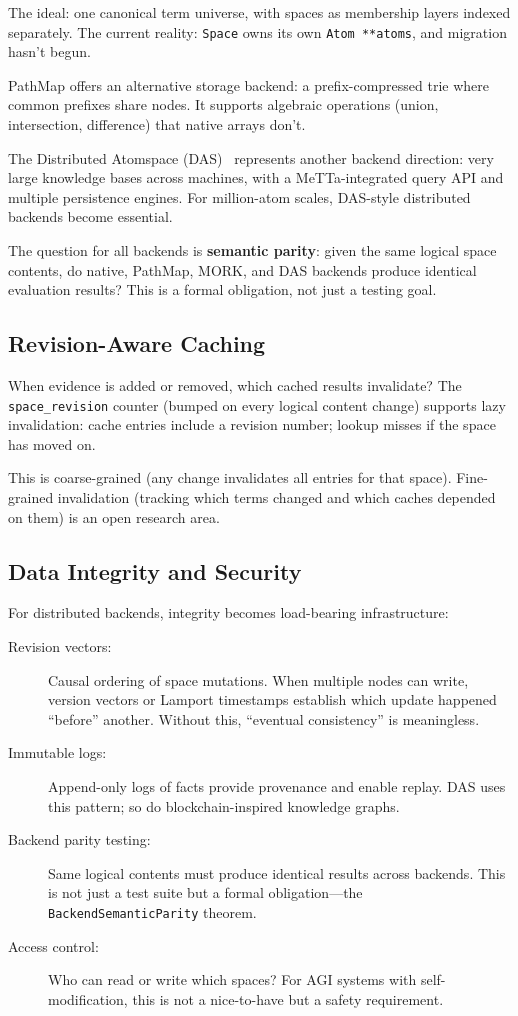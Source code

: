 \documentclass[11pt]{article}
\newcommand{\code}[1]{\texttt{#1}}
\newcommand{\PathMap}{\textup{PathMap}}
\newcommand{\MORK}{\textup{MORK}}
\begin{document}
The ideal: one canonical term universe, with spaces as membership layers
indexed separately.  The current reality: \code{Space} owns its own
\code{Atom **atoms}, and migration hasn't begun.

\PathMap{} offers an alternative storage backend: a prefix-compressed
trie where common prefixes share nodes.  It supports algebraic operations
(union, intersection, difference) that native arrays don't.

The Distributed Atomspace (DAS)~\cite{DAS} represents another backend
direction: very large knowledge bases across machines, with a MeTTa-integrated
query API and multiple persistence engines.  For million-atom scales,
DAS-style distributed backends become essential.

The question for all backends is \textbf{semantic parity}: given the same
logical space contents, do native, \PathMap{}, \MORK{}, and DAS backends
produce identical evaluation results?  This is a formal obligation, not
just a testing goal.

\subsection{Revision-Aware Caching}

When evidence is added or removed, which cached results invalidate?
The \code{space\_revision} counter (bumped on every logical content change)
supports lazy invalidation: cache entries include a revision number;
lookup misses if the space has moved on.

This is coarse-grained (any change invalidates all entries for that space).
Fine-grained invalidation (tracking which terms changed and which caches
depended on them) is an open research area.

\subsection{Data Integrity and Security}

For distributed backends, integrity becomes load-bearing infrastructure:

\begin{description}
\item[Revision vectors:] Causal ordering of space mutations.  When multiple
  nodes can write, version vectors or Lamport timestamps establish which
  update happened ``before'' another.  Without this, ``eventual consistency''
  is meaningless.
\item[Immutable logs:] Append-only logs of facts provide provenance and
  enable replay.  DAS uses this pattern; so do blockchain-inspired
  knowledge graphs.
\item[Backend parity testing:] Same logical contents must produce identical
  results across backends.  This is not just a test suite but a formal
  obligation---the \code{BackendSemanticParity} theorem.
\item[Access control:] Who can read or write which spaces?  For AGI systems
  with self-modification, this is not a nice-to-have but a safety
  requirement.
\end{description}
\end{document}
